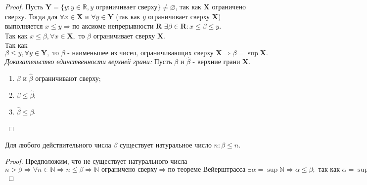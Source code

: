 \begin{proof}
	Пусть $\mathbf{Y} = \{y: y \in \mathbb{R}, y \mbox{ ограничивает сверху}\} \neq \varnothing$, так как $\mathbf{X}$ ограничено сверху. Тогда для $\forall x \in \mathbf{X}$ и $\forall y \in \mathbf{Y}$ (так как $y$ ограничивает сверху $\mathbf{X}$) выполняется $x \leq y \Rightarrow \mbox{по аксиоме непрерывности } \mathbf{R}$ $\exists \beta \in \mathbf{R}: x \leq \beta \leq y$. \\
	Так как $x \leq \beta, \forall x \in \mathbf{X}, \mbox{ то } \beta \mbox{ ограничивает сверху } \mathbf{X}.$ \\
	Так как $\beta \leq y, \forall y \in \mathbf{Y}, \mbox{ то } \beta \mbox{ - наименьшее из чисел, ограничивающих сверху } \mathbf{X} \Rightarrow \beta = \sup \mathbf{X}.$ \\
	\textit{Доказательство единственности верхней грани:} Пусть $\beta \mbox{ и } \hat{\beta} \mbox{ - верхние грани } \textbf{X}$.
	\begin{enumerate}
		\item $\beta \mbox{ и } \hat{\beta}$ ограничивают сверху;
		\item $\beta \leq \hat{\beta}$;
		\item $\hat{\beta} \leq \beta$. 
	\end{enumerate}
\end{proof}

\begin{theorem}
	Для любого действительного числа $\beta$ существует натуральное число $n: \beta \le n$.
\end{theorem}

\begin{proof}
	Предположим, что не существует натурального числа $n > \beta \Rightarrow \forall n \in \mathbb{N} \Rightarrow n \leq \beta \Rightarrow \mathbb{N} \mbox{ ограничено сверху} \Rightarrow \mbox{по теореме Вейерштрасса } \exists \alpha = \sup \mathbb{N} \Rightarrow \alpha \leq \beta; \mbox{ так как } \alpha = \sup \mathbb{N} \Rightarrow \exists n > \alpha - 1, n \in \mathbb{N}; \hat{n} + 1 > \alpha, \mbox{ но } \hat{n} + 1 \in \mathbb{N} \Rightarrow \alpha \mbox{ не ограничивает сверху} \Rightarrow \mbox{противоречие}.$
\end{proof}